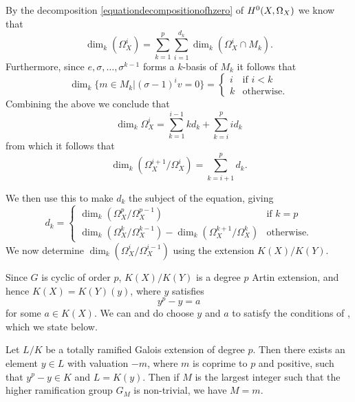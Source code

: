 By the decomposition \eqref{equationdecompositionofhzero} of ${H^0(X,\Omega_X)}$ we know that
    \[
    \dim_k \left( \Omega_X^i\right) = \sum_{k=1}^p \sum_{i=1}^{d_k} \dim_k \left( \Omega_X^i \cap M_k \right).
    \]
Furthermore, since $e, \sigma, \ldots, \sigma^{k-1}$ forms a $k$-basis of $M_k$ it follows that 
    \[
    \dim_k\{ m \in M_k |(\sigma - 1)^iv = 0 \} = 
        \begin{cases}
        i & \text{if } i < k \\
        k & \text{otherwise.}
        \end{cases}
     \]   
Combining the above we conclude that 
    \[
    \dim_k \Omega_X^i = \sum_{k=1}^{i-1} kd_k + \sum_{k=i}^p id_k
    \]
from which it follows that
    \[
    \dim_k \left( \Omega_X^{i+1}/\Omega_X^i \right) = \sum_{k=i+1}^p d_k.
    \]


We then use this to make $d_k$ the subject of the equation, giving
    \[
    d_k = 
        \begin{cases}
        \dim_k \left( \Omega_X^p/\Omega_X^{p-1} \right) & \text{if } k = p \\
        \dim_k \left( \Omega_X^k/\Omega_X^{k-1} \right) - \dim_k \left( \Omega_X^{k+1}/\Omega_X^k \right) & \text{otherwise.}
        \end{cases}
    \]
We now determine $\dim_k\left( \Omega_X^i/\Omega_X^{i-1} \right)$ using the extension $K(X)/K(Y)$.

Since $G$ is cyclic of order $p$, $K(X)/K(Y)$ is a degree $p$ Artin extension, and hence $K(X) = K(Y)(y)$, where $y$ satisfies
    \[
    y^p - y = a
    \]
for some $a \in K(X)$.
We can and do choose $y$ and $a$ to satisfy the conditions of \cite[App.\ 5, Lem.\ 5.1]{quaddiffequi}, which we state below.

    \begin{lem}
    Let $L/K$ be a totally ramified Galois extension of degree $p$.
    Then there exists an element $y \in L$ with valuation $-m$, where $m$ is coprime to $p$ and positive, such that $y^p - y \in K$ and $L = K(y)$.
    Then if $M$ is the largest integer such that the higher ramification group $G_M$ is non-trivial, we have $M = m$.
    \end{lem}

